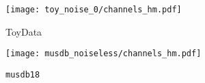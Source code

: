 \begin{subfigure}{0.35\textwidth}
    \texttt{[image: toy\_noise\_0/channels\_hm.pdf]}%
    \caption{ToyData}%
    \label{fig:noiseless_channels_toy}%
\end{subfigure}
\begin{subfigure}{0.35\textwidth}
    \texttt{[image: musdb\_noiseless/channels\_hm.pdf]}%
    \caption{\texttt{musdb18}}%
    \label{fig:noiseless_channels_musdb}%
\end{subfigure}
